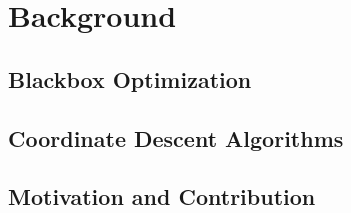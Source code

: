\chapter{Background}

\section{Blackbox Optimization}

\section{Coordinate Descent Algorithms}

\section{Motivation and Contribution}
